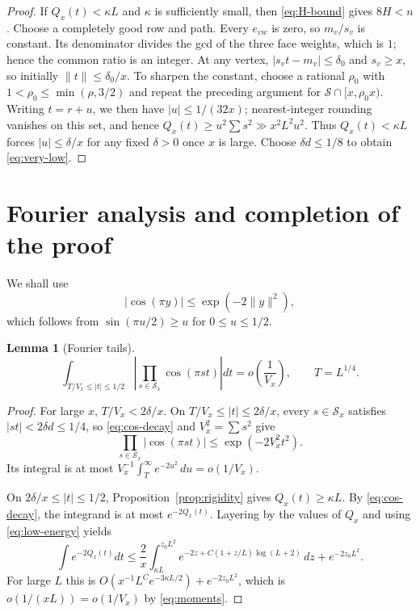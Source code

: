 \documentclass[10pt,reqno]{amsart}
\newtheorem{lemma}[theorem]{Lemma}
\newcommand{\Sg}{\mathcal S}
\newcommand{\Sx}{\mathcal S_x}
\newcommand{\distz}[1]{\lVert #1\rVert}
\begin{document}
\begin{proof}
If $Q_x(t)<\kappa L$ and $\kappa$ is sufficiently small, then
\eqref{eq:H-bound} gives $8H<n$.  Choose a completely good row and path.  Every
$e_{vw}$ is zero, so $m_v/s_v$ is constant.  Its denominator divides the gcd
of the three face weights, which is $1$; hence the common ratio is an integer.
At any vertex, $|s_vt-m_v|\le\delta_0$ and $s_v\ge x$, so initially
$\distz t\le\delta_0/x$.  To sharpen the constant, choose a rational $\rho_0$ with
$1<\rho_0\le\min(\rho,3/2)$ and repeat the preceding argument for
$\Sg\cap[x,\rho_0x)$.  Writing $t=r+u$, we then have $|u|\le1/(32x)$;
nearest-integer rounding vanishes on this set, and hence
$Q_x(t)\ge u^2\sum s^2\gg x^2L^2u^2$.  Thus $Q_x(t)<\kappa L$ forces
$|u|\le\delta/x$ for any fixed $\delta>0$ once $x$ is large.  Choose
$\delta d\le1/8$ to obtain \eqref{eq:very-low}.
\end{proof}

\section{Fourier analysis and completion of the proof}

We shall use
\begin{equation}\label{eq:cos-decay}
 |\cos(\pi y)|\le \exp(-2\distz y^2),
\end{equation}
which follows from
$\sin(\pi u/2)\ge u$ for $0\le u\le1/2$.

\begin{lemma}[Fourier tails]\label{lem:tails}
\begin{equation}\label{eq:tail}
 \int_{T/V_x\le |t|\le1/2}
 \left|\prod_{s\in\Sx}\cos(\pi st)\right|dt
 =o\!\left(\frac1{V_x}\right),
 \qquad T=L^{1/4}.
\end{equation}
\end{lemma}

\begin{proof}
For large $x$, $T/V_x<2\delta/x$.  On
$T/V_x\le |t|\le2\delta/x$, every $s\in\Sx$ satisfies
$|st|<2\delta d\le1/4$, so \eqref{eq:cos-decay} and
$V_x^2=\sum s^2$ give
\[
 \prod_{s\in\Sx}|\cos(\pi st)|\le \exp(-2V_x^2t^2).
\]
Its integral is at most
$V_x^{-1}\int_T^\infty e^{-2u^2}\,du=o(1/V_x)$.

On $2\delta/x\le |t|\le1/2$, Proposition~\ref{prop:rigidity} gives
$Q_x(t)\ge\kappa L$.  By \eqref{eq:cos-decay}, the integrand is at most
$e^{-2Q_x(t)}$.  Layering by the values of $Q_x$ and using
\eqref{eq:low-energy} yields
\[
 \int e^{-2Q_x(t)}dt
 \le \frac2x\int_{\kappa L}^{z_0L^2}
 e^{-2z+C(1+z/L)\log(L+2)}\,dz+e^{-2z_0L^2}.
\]
For large $L$ this is $O(x^{-1}L^C e^{-3\kappa L/2})+e^{-2z_0L^2}$,
which is $o(1/(xL))=o(1/V_x)$ by \eqref{eq:moments}.
\end{proof}
\end{document}
